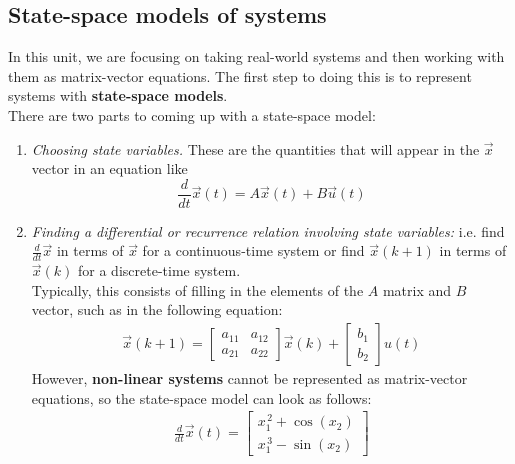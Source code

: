 
\renewcommand{\arraystretch}{1.25}

\subsection*{State-space models of systems}
In this unit, we are focusing on taking real-world systems and then working with them as matrix-vector equations. The first step to doing this is to represent systems with \textbf{state-space models}. \\
\newline
There are two parts to coming up with a state-space model:
\begin{enumerate}
    \item \textit{Choosing state variables.} These are the quantities that will appear in the $\vec{x}$ vector in an equation like 
    $$\frac{d}{dt}\vec{x}(t) = A\vec{x}(t) + B\vec{u}(t)$$ 
    \item \textit{Finding a differential or recurrence relation involving state variables:} i.e. find $\frac{d}{dt} \vec{x}$ in terms of $\vec{x}$ for a continuous-time system or find $\vec{x}(k + 1)$ in terms of $\vec{x}(k)$ for a discrete-time system. \\
    \newline
    Typically, this consists of filling in the elements of the $A$ matrix and $B$ vector, such as in the following equation:
    \begin{align*}
        \vec{x}(k + 1) = \begin{bmatrix}
            a_{11} & a_{12} \\
            a_{21} & a_{22}
        \end{bmatrix} \vec{x}(k) + \begin{bmatrix} b_1 \\ b_2 \end{bmatrix} u(t)
    \end{align*}
    However, \textbf{non-linear systems} cannot be represented as matrix-vector equations, so the state-space model can look as follows:
    \begin{align*}
        \frac{d}{dt} \vec{x}(t) = \begin{bmatrix}
            x_1^{\,2} + \cos(x_2) \\
            x_1^{\,3} - \sin(x_2)
        \end{bmatrix}
    \end{align*}
\end{enumerate}
